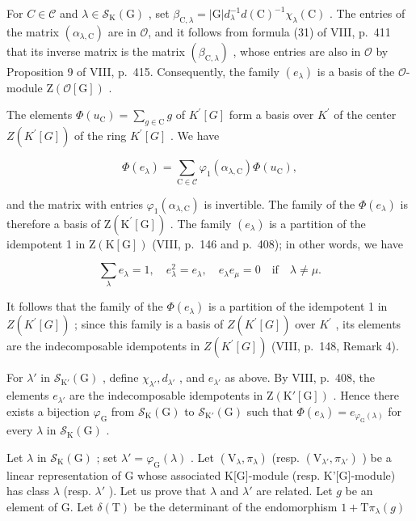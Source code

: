 For \(C \in \mathcal{C}\) and \(\lambda \in \mathcal{S}_{\mathrm{K}}(\mathrm{G})\) , set \(\beta_{\mathrm{C},\lambda} = |\mathrm{G}| d_{\lambda}^{-1} d(\mathrm{C})^{-1} \chi_{\lambda}(\mathrm{C})\) . The entries of the matrix \((\alpha_{\lambda,\mathrm{C}})\) are in \(\mathcal{O}\), and it follows from formula (31) of VIII, p.~411 that its inverse matrix is the matrix \((\beta_{\mathrm{C},\lambda})\) , whose entries are also in \(\mathcal{O}\) by Proposition 9 of VIII, p.~415. Consequently, the family \((e_{\lambda})\) is a basis of the \(\mathcal{O}\)-module \(\mathrm{Z}(\mathcal{O}[\mathrm{G}])\) .

The elements \(\Phi(u_{\mathrm{C}}) = \sum_{g\in \mathrm{C}}g\) of \(K^{\prime}[G]\) form a basis over \(K^{\prime}\) of the center \(Z(K^{\prime}[G])\) of the ring \(K^{\prime}[G]\) . We have

\[
\Phi (e _ {\lambda}) = \sum_ {\mathrm{C} \in \mathcal {C}} \varphi_ {1} (\alpha_ {\lambda , \mathrm{C}}) \Phi (u _ {\mathrm{C}}),\tag{46}
\]

and the matrix with entries \(\varphi_{1}(\alpha_{\lambda,\mathrm{C}})\) is invertible. The family of the \(\Phi(e_{\lambda})\) is therefore a basis of \(\mathrm{Z}(\mathrm{K}^{\prime}[\mathrm{G}])\) . The family \((e_{\lambda})\) is a partition of the idempotent 1 in \(\mathrm{Z}(\mathrm{K}[\mathrm{G}])\) (VIII, p.~146 and p.~408); in other words, we have

\[
\sum_ {\lambda} e _ {\lambda} = 1, \quad e _ {\lambda} ^ {2} = e _ {\lambda}, \quad e _ {\lambda} e _ {\mu} = 0 \quad \mathrm{if} \quad \lambda \neq \mu .
\]

It follows that the family of the \(\Phi(e_{\lambda})\) is a partition of the idempotent 1 in \(Z(K^{\prime}[G])\) ; since this family is a basis of \(Z(K^{\prime}[G])\) over \(K^{\prime}\) , its elements are the indecomposable idempotents in \(Z(K^{\prime}[G])\) (VIII, p.~148, Remark 4).

For \(\lambda'\) in \(\mathcal{S}_{\mathrm{K}'}(\mathrm{G})\) , define \(\chi_{\lambda'}, d_{\lambda'}\) , and \(e_{\lambda'}\) as above. By VIII, p.~408, the elements \(e_{\lambda'}\) are the indecomposable idempotents in \(\mathrm{Z}(\mathrm{K}'[\mathrm{G}])\) . Hence there exists a bijection \(\varphi_{\mathrm{G}}\) from \(\mathcal{S}_{\mathrm{K}}(\mathrm{G})\) to \(\mathcal{S}_{\mathrm{K}'}(\mathrm{G})\) such that \(\Phi(e_{\lambda}) = e_{\varphi_{\mathrm{G}}(\lambda)}\) for every \(\lambda\) in \(\mathcal{S}_{\mathrm{K}}(\mathrm{G})\) .

Let \(\lambda\) in \(\mathcal{S}_{\mathrm{K}}(\mathrm{G})\) ; set \(\lambda' = \varphi_{\mathrm{G}}(\lambda)\) . Let \((\mathrm{V}_{\lambda}, \pi_{\lambda})\) (resp. \((\mathrm{V}_{\lambda'}, \pi_{\lambda'})\) ) be a linear representation of G whose associated K{[}G{]}-module (resp. K'{[}G{]}-module) has class \(\lambda\) (resp. \(\lambda'\) ). Let us prove that \(\lambda\) and \(\lambda'\) are related. Let \(g\) be an element of G. Let \(\delta(\mathrm{T})\) be the determinant of the endomorphism \(1 + \mathrm{T}\pi_{\lambda}(g)\)

